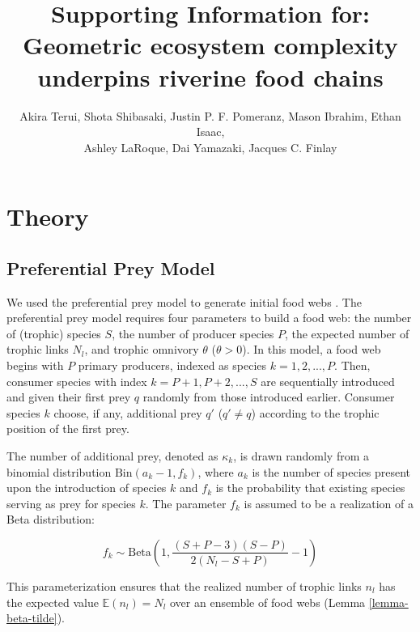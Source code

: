 \documentclass[11pt, class=article, crop=false]{standalone}
\title{Supporting Information for: \\Geometric ecosystem complexity underpins riverine food chains}
\author{
Akira Terui, 
Shota Shibasaki,
Justin P. F. Pomeranz,
Mason Ibrahim,
Ethan Isaac,\\
Ashley LaRoque,
Dai Yamazaki,
Jacques C. Finlay
}
\date{} %
\theoremstyle{definition}
\begin{document}
\renewcommand{\theequation}{S\arabic{equation}}
\renewcommand{\thetable}{S\arabic{table}}
\renewcommand{\thefigure}{S\arabic{figure}}

\maketitle

\tableofcontents

\newpage

\section{Theory}

\subsection{Preferential Prey Model}

We used the preferential prey model to generate initial food webs \cite{johnson_trophic_2014}.
The preferential prey model requires four parameters to build a food web: the number of (trophic) species $S$, the number of producer species $P$, the expected number of trophic links $N_l$, and trophic omnivory $\theta$ ($\theta > 0$).
In this model, a food web begins with $P$ primary producers, indexed as species $k = 1, 2, ..., P$.
Then, consumer species with index $k = P + 1, P + 2, ..., S$ are sequentially introduced and given their first prey $q$ randomly from those introduced earlier.
Consumer species $k$ choose, if any, additional prey $q'$ ($q' \ne q$) according to the trophic position of the first prey.

The number of additional prey, denoted as $\kappa_k$, is drawn randomly from a binomial distribution $\mathrm{Bin}(a_k - 1, f_k)$, where $a_k$ is the number of species present upon the introduction of species $k$ and $f_k$ is the probability that existing species serving as prey for species $k$.
The parameter $f_k$ is assumed to be a realization of a Beta distribution:

\begin{equation}
    f_k 
    \sim 
    \mathrm{Beta}
    \left(
        1, \frac{(S + P - 3)(S - P)}{2(N_l - S + P)} - 1
    \right)
\end{equation}

This parameterization ensures that the realized number of trophic links $n_l$ has the expected value $\mathbb{E}(n_l) = N_l$ over an ensemble of food webs (Lemma \ref{lemma-beta-tilde}).
\end{document}

